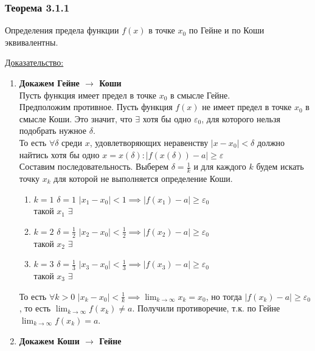\documentclass[12pt]{article}
\begin{document}
    \subsubsection*{Теорема 3.1.1}\label{th:3.1.1}
    Определения предела функции $f(x)$ в точке $x_0$ по Гейне и по Коши эквивалентны.\par\noindent
    \underline{Доказательство:}
    \begin{adjustwidth}{1.5em}{1.5em}
        \begin{enumerate}
            \item \textbf{Докажем Гейне $\rightarrow$ Коши}\\
            Пусть функция имеет предел в точке $x_0$ в смысле Гейне.\\
            Предположим противное. Пусть функция $f(x)$ не имеет предел в точке $x_0$ в смысле Коши. Это значит, что $\exists$ хотя бы одно $\varepsilon_0$, для которого нельзя подобрать нужное $\delta$.\\
            То есть $\forall \delta$ среди $x$, удовлетворяющих неравенству $|x-x_0| < \delta$ должно найтись хотя бы одно $x = x(\delta) : |f(x(\delta)) - a| \ge \varepsilon$\\
            Составим последовательность. Выберем $\delta = \frac{1}{k}$ и для каждого $k$ будем искать точку $x_k$ для которой не выполняется определение Коши.
            \begin{enumerate}
                \item $k = 1$ $\delta = 1$ $|x_1 - x_0| < 1 \implies |f(x_1) - a| \ge \varepsilon_0$\\
                такой $x_1$ $\exists$
                \item $k = 2$ $\delta = \frac{1}{2}$ $|x_2 - x_0| < \frac{1}{2} \implies |f(x_2) - a| \ge \varepsilon_0$\\
                такой $x_2$ $\exists$
                \item $k = 3$ $\delta = \frac{1}{3}$ $|x_3 - x_0| < \frac{1}{3} \implies |f(x_3) - a| \ge \varepsilon_0$\\
                такой $x_3$ $\exists$
            \end{enumerate}
            То есть $\forall k > 0$ $|x_k - x_0| < \frac{1}{k} \implies \lim_{k\to\infty} x_k = x_0$, но тогда $|f(x_k) - a| \ge \varepsilon_0$, то есть $\lim_{k\to\infty} f(x_k) \ne a$. Получили противоречие, т.к. по Гейне $\lim_{k\to\infty} f(x_k) = a$.
            \item \textbf{Докажем Коши $\rightarrow$ Гейне}\\

\end{enumerate}
\end{adjustwidth}
\end{document}

